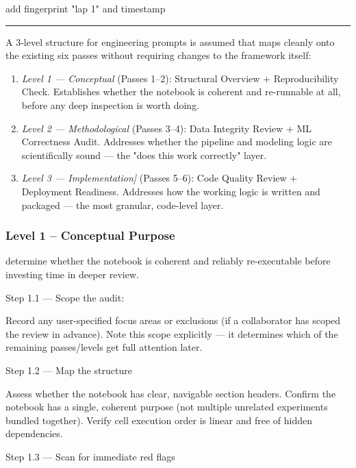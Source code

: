 \documentclass[11pt, a4paper]{article}
\begin{document}
\begin{description}
{	add fingerprint "lap 1" and timestamp
	
}
\vspace{.3cm}
\rule{\textwidth}{0.3pt}

	\item[Lap 2. Structured evaluation]\;  
	A 3-level structure for engineering prompts is assumed that maps cleanly onto the existing six passes without requiring changes to the framework itself:
	
	\begin{enumerate}{ }
		\item  \textit{Level 1 — Conceptual} (Passes 1–2):
		Structural Overview + Reproducibility Check. Establishes whether the notebook is coherent and re-runnable at all, before any deep inspection is worth doing.
		
		\item \textit{Level 2 — Methodological} (Passes 3–4):
		Data Integrity Review + ML Correctness Audit. Addresses whether the pipeline and modeling logic are scientifically sound — the "does this work correctly" layer.
		
		\item \textit{Level 3 — Implementation]} (Passes 5–6):
		Code Quality Review + Deployment Readiness. Addresses how the working logic is written and packaged — the most granular, code-level layer.
	\end{enumerate}
\end{description}

\subsubsection*{Level 1 -- Conceptual Purpose} 
 determine whether the notebook is coherent and reliably re-executable before investing time in deeper review.

Step 1.1 — Scope the audit: 

Record any user-specified focus areas or exclusions (if a collaborator has scoped the review in advance).
Note this scope explicitly — it determines which of the remaining passes/levels get full attention later.

Step 1.2 — Map the structure

Assess whether the notebook has clear, navigable section headers.
Confirm the notebook has a single, coherent purpose (not multiple unrelated experiments bundled together).
Verify cell execution order is linear and free of hidden dependencies.

Step 1.3 — Scan for immediate red flags
\end{document}
